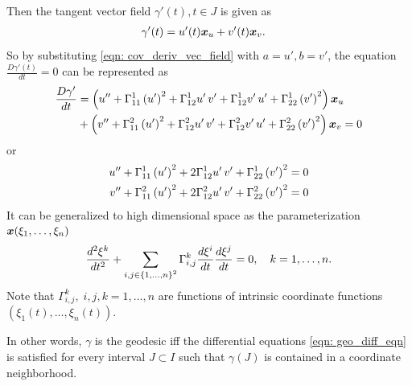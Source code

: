 \documentclass[11pt]{article}
\begin{document}
\begin{itemize}
Then the tangent vector field $\gamma'(t), t\in J$ is given as 
\begin{align*}
\gamma'(t) &= u'(t)\boldsymbol{x}_{u} + v'(t)\boldsymbol{x}_{v}.
\end{align*}
So by substituting \eqref{eqn: cov_deriv_vec_field} with $a= u', b= v'$,  the equation  $\frac{D\gamma'(t)}{dt} = 0$ can be represented as
\begin{align*}
\frac{D\gamma'}{dt} &= \left(u'' + \Gamma_{11}^{1}\left(u'\right)^{2} + \Gamma_{12}^{1}u'\,v' + \Gamma_{12}^{1}v'\,u' +  \Gamma_{22}^{1}\left(v'\right)^{2} \right) \boldsymbol{x}_{u} \nonumber\\
&+ \left(v'' + \Gamma_{11}^{2}\left(u'\right)^{2}+ \Gamma_{12}^{2}u'\,v'+ \Gamma_{12}^{2}v'\,u'+  \Gamma_{22}^{2}\left(v'\right)^{2} \right) \boldsymbol{x}_{v} = 0
\end{align*}
or 
\begin{align}
u'' + \Gamma_{11}^{1}\left(u'\right)^{2} + 2\Gamma_{12}^{1}u'\,v' +  \Gamma_{22}^{1}\left(v'\right)^{2} &=0\nonumber\\
v'' + \Gamma_{11}^{2}\left(u'\right)^{2}+ 2\Gamma_{12}^{2}u'\,v'+  \Gamma_{22}^{2}\left(v'\right)^{2}&=0\label{eqn: geo_diff_eqn}
\end{align}
It can be generalized to high dimensional space as the parameterization $\boldsymbol{x}(\xi_{1},\ldots, \xi_{n})$
\begin{align}
\frac{d^{2} \xi^{k}}{dt^{2}} + \sum_{i,j \in \left\{1,\ldots,n\right\}^{2}}\Gamma_{i,j}^{k}\frac{d\xi^{i}}{dt}\frac{d\xi^{j}}{dt} = 0, \quad k=1,\ldots, n.\label{eqn: geo_diff_eqn_high}
\end{align}
Note that $\Gamma_{i,j}^{k},\; i,j,k=1,\ldots,n$ are functions of intrinsic coordinate functions $(\xi_{1}(t),\ldots, \xi_{n}(t)).$

In other words, $\gamma$ is the geodesic iff the differential equations \eqref{eqn: geo_diff_eqn} is satisfied for every interval $J \subset I$ such that $\gamma(J)$ is contained in a coordinate neighborhood. \\


\end{itemize}
\end{document}
